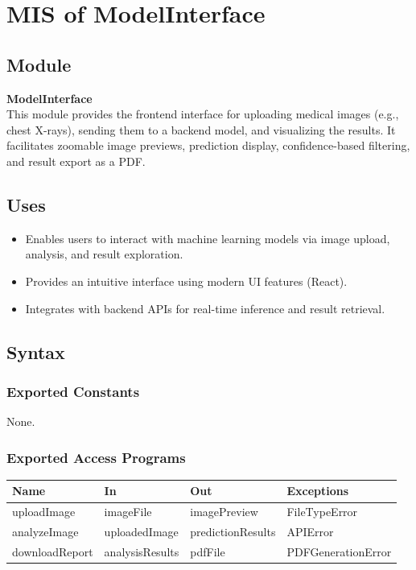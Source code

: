 \documentclass[12pt, titlepage]{article}
\begin{document}
\section{MIS of ModelInterface}

\subsection{Module}
\textbf{ModelInterface} \\
This module provides the frontend interface for uploading medical images (e.g., chest X-rays), sending them to a backend model, and visualizing the results. It facilitates zoomable image previews, prediction display, confidence-based filtering, and result export as a PDF.

\subsection{Uses}
\begin{itemize}
    \item Enables users to interact with machine learning models via image upload, analysis, and result exploration.
    \item Provides an intuitive interface using modern UI features (React).
    \item Integrates with backend APIs for real-time inference and result retrieval.
\end{itemize}

\subsection{Syntax}

\subsubsection{Exported Constants}
None.

\subsubsection{Exported Access Programs}

\begin{center}
  \begin{tabular}{|p{4cm}|p{4cm}|p{4cm}|}
    \hline
    \textbf{Name} & \textbf{In} & \textbf{Out} & \textbf{Exceptions} \\
    \hline
    uploadImage & imageFile & imagePreview & FileTypeError \\
    \hline
    analyzeImage & uploadedImage & predictionResults & APIError \\
    \hline
    downloadReport & analysisResults & pdfFile & PDFGenerationError \\
    \hline
  \end{tabular}
\end{center}
\end{document}
